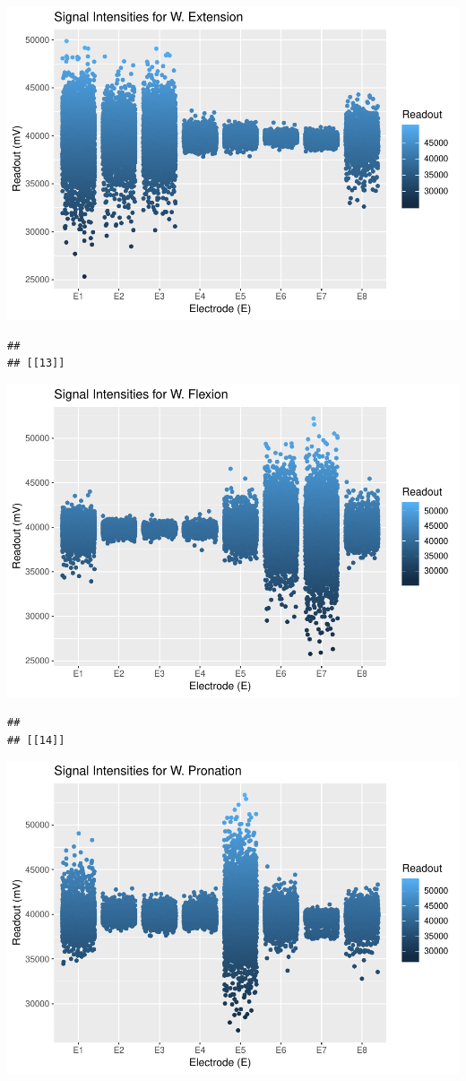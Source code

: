 \documentclass[]{article}
\begin{document}
\includegraphics{Megahand_files/figure-latex/unnamed-chunk-6-12.pdf}

\begin{verbatim}
## 
## [[13]]
\end{verbatim}

\includegraphics{Megahand_files/figure-latex/unnamed-chunk-6-13.pdf}

\begin{verbatim}
## 
## [[14]]
\end{verbatim}

\includegraphics{Megahand_files/figure-latex/unnamed-chunk-6-14.pdf}
\end{document}
